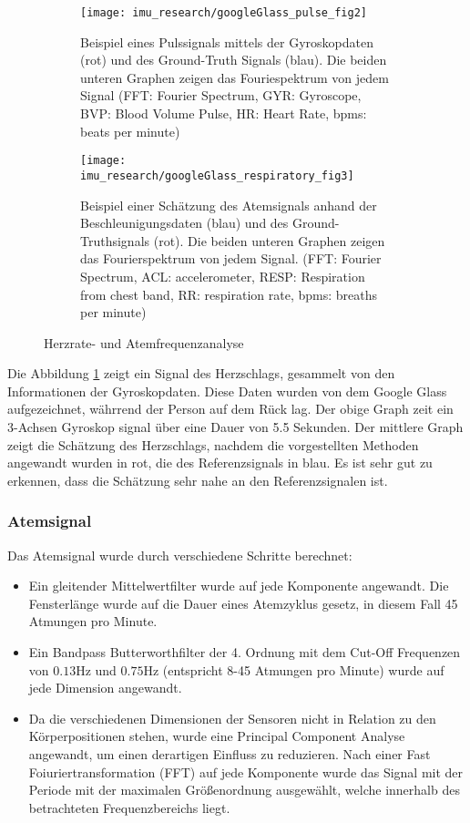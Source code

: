 \begin{figure}[ht]
    \centering
    \begin{subfigure}{.49\textwidth}
        \texttt{[image: imu\_research/googleGlass\_pulse\_fig2]}
      \caption{Beispiel eines Pulssignals mittels der Gyroskopdaten (rot) und des Ground-Truth Signals (blau). Die beiden unteren Graphen zeigen das Fouriespektrum von jedem Signal (FFT: Fourier Spectrum, GYR: Gyroscope, BVP: Blood Volume Pulse, HR: Heart Rate, bpms: beats per minute)}
      \label{background:googleGlass:pulse_wave}
    \end{subfigure}
    \begin{subfigure}{.49\textwidth}
        \texttt{[image: imu\_research/googleGlass\_respiratory\_fig3]}
      \caption{Beispiel einer Schätzung des Atemsignals anhand der Beschleunigungsdaten (blau) und des Ground-Truthsignals (rot). Die beiden unteren Graphen zeigen das Fourierspektrum von jedem Signal. (FFT: Fourier Spectrum, ACL: accelerometer, RESP: Respiration from chest band, RR: respiration rate, bpms: breaths per minute)}
      \label{background:googleGlass:respiratory_wave}
    \end{subfigure}
    \caption{Herzrate- und Atemfrequenzanalyse}
    \label{background:googleGlass}
  \end{figure}

Die Abbildung \ref{background:googleGlass:pulse_wave} zeigt ein Signal des Herzschlags, gesammelt von den Informationen der Gyroskopdaten. Diese Daten wurden von dem Google Glass aufgezeichnet, währrend der Person auf dem Rück lag. Der obige Graph zeit ein 3-Achsen Gyroskop signal über eine Dauer von 5.5 Sekunden. Der mittlere Graph zeigt die Schätzung des Herzschlags, nachdem die vorgestellten Methoden angewandt wurden in rot, die des Referenzsignals in blau. Es ist sehr gut zu erkennen, dass die Schätzung sehr nahe an den Referenzsignalen ist.

\subsubsection{Atemsignal}
Das Atemsignal wurde durch verschiedene Schritte berechnet:
\begin{itemize}
    \item Ein gleitender Mittelwertfilter wurde auf jede Komponente angewandt. Die Fensterlänge wurde auf die Dauer eines Atemzyklus gesetz, in diesem Fall 45 Atmungen pro Minute. 
    \item Ein Bandpass Butterworthfilter der 4. Ordnung mit dem Cut-Off Frequenzen von $0.13 \si{\hertz}$ und $0.75 \si{\hertz}$ (entspricht 8-45 Atmungen pro Minute) wurde auf jede Dimension angewandt.
    \item Da die verschiedenen Dimensionen der Sensoren nicht in Relation zu den Körperpositionen stehen, wurde eine Principal Component Analyse angewandt, um einen derartigen Einfluss zu reduzieren. Nach einer Fast Foiuriertransformation (FFT) auf jede Komponente wurde das Signal mit der Periode mit der maximalen Größenordnung ausgewählt, welche innerhalb des betrachteten Frequenzbereichs liegt.
\end{itemize}

